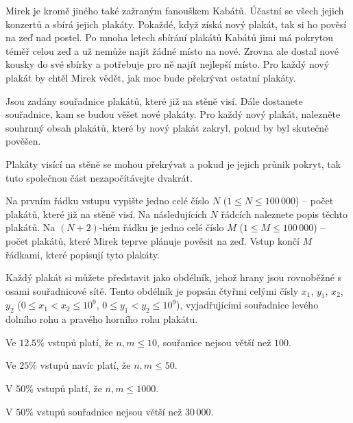 

\usepackage{tikz}





Mirek je kromě jiného také zažraným fanouškem Kabátů.
Účastní se všech jejich konzertů a sbírá jejich plakáty.
Pokaždé, když získá nový plakát, tak si ho pověsí na zeď nad postel.
Po mnoha letech sbírání plakátů Kabátů jimi má pokrytou téměř celou zeď
a už nemůže najít žádné místo na nové.
Zrovna ale dostal nové kousky do své sbírky a potřebuje pro ně najít nejlepší místo.
Pro každý nový plakát by chtěl Mirek vědět, jak moc bude překrývat ostatní plakáty.


Jsou zadány souřadnice plakátů, které již na stěně visí.
Dále dostanete souřadnice, kam se budou věšet nové plakáty.
Pro každý nový plakát, nalezněte souhrnný obsah plakátů, které by nový plakát zakryl, pokud by byl skutečně pověšen.

Plakáty visící na stěně se mohou překrývat a pokud je jejich průnik pokryt, tak tuto společnou část nezapočítávejte dvakrát.


Na prvním řádku vstupu vypište jedno celé číslo $N$ ($1 \le N \le 100\,000$)
-- počet plakátů, které již na stěně visí.
Na následujících $N$ řádcích naleznete popis těchto plakátů.
Na $(N+2)$-hém řádku je jedno celé číslo $M$ ($1 \le M \le 100\,000$)
-- počet plakátů, které Mirek teprve plánuje pověsit na zeď.
Vstup končí $M$ řádkami, které popisují tyto plakáty.

Každý plakát si můžete představit jako obdélník, jehož hrany jsou rovnoběžné s osami souřadnicové sítě.
Tento obdélník je popsán čtyřmi celými čísly $x_1$, $y_1$, $x_2$, $y_2$
($0 \le x_1 < x_2 \le 10^9$, $0 \le y_1 < y_2 \le 10^9$),
vyjadřujícími souřadnice levého dolního rohu a pravého horního rohu plakátu.

Ve $12.5\%$ vstupů platí, že $n, m \le 10$, souřanice nejsou větší než $100$.

Ve $25\%$ vstupů navíc platí, že $n, m \le 50$.

V $50\%$ vstupů platí, že $n, m \le 1000$.

V $50\%$ vstupů souřadnice nejsou větší než $30\,000$.

